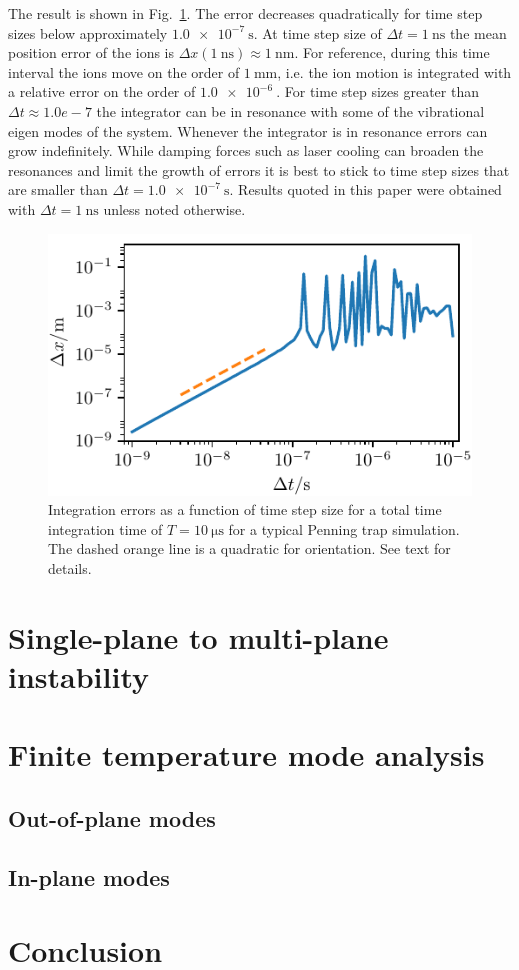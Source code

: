\documentclass[aps, pra, preprint]{revtex4-1}
\begin{document}
The result is shown in Fig.~\ref{fig:convergence}. The error
decreases quadratically for time step sizes below approximately
$\SI{1.0e-7}{\second}$. At time step size of $\Delta t =
\SI{1}{\nano\second}$ the mean position error of the ions is
$\Delta x(\SI{1}{\nano\second})\approx \SI{1}{\nano\meter}$. For
reference, during this time interval the ions move on the order
of $\SI{1}{\milli\meter}$, i.e. the ion motion is integrated with
a relative error on the order of $\SI{1.0e-6}{}$. For time step
sizes greater than $\Delta t\approx 1.0e-7$ the integrator can be in
resonance with some of the vibrational eigen modes of the system.
Whenever the integrator is in resonance errors can grow
indefinitely. While damping forces such as laser cooling can
broaden the resonances and limit the growth of errors it is best
to stick to time step sizes that are smaller than $\Delta t =
\SI{1.0e-7}{\second}$. Results quoted in this paper were obtained
with $\Delta t = \SI{1}{\nano\second}$ unless noted otherwise.
\begin{figure}
  \includegraphics{./figures/fig_convergence.pdf}
  \caption{Integration errors as a function of time step size for
    a total time integration time of $T=\SI{10}{\us}$ for a
    typical Penning trap simulation. The dashed orange line is a
    quadratic for orientation. See text for details.}
  \label{fig:convergence}
\end{figure}


\section{Single-plane to multi-plane instability}


\section{Finite temperature mode analysis}

\subsection{Out-of-plane modes}

\subsection{In-plane modes}



\section{Conclusion}


\end{document}
